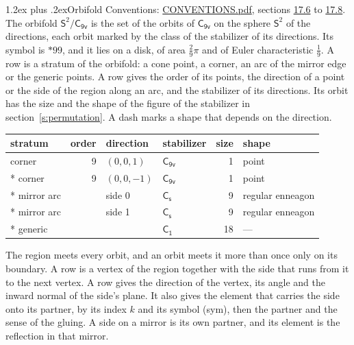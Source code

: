 \documentclass[10pt,a4paper]{article}
\makeatletter
\renewcommand\section{\@startsection{section}{1}{\z@}{-3ex plus -1ex minus -.2ex}%
  {1.2ex plus .2ex}{\normalfont\large\sffamily\bfseries\color{parttitle}}}
\numberwithin{equation}{section}
\newcommand{\grp}[1]{\mathsf{#1}}
\newcommand{\orbname}[1]{#1}
\newcommand{\dirvec}[3]{(#1, #2, #3)}
\newcommand{\twosphere}{\mathsf{S}^{2}}
\makeatother
\begin{document}
\section{Orbifold}\label{s:orbifold}
Conventions: \href{../../CONVENTIONS.pdf}{CONVENTIONS.pdf}, sections \href{../../CONVENTIONS.pdf\#conv.17.6}{17.6} to \href{../../CONVENTIONS.pdf\#conv.17.8}{17.8}.
The orbifold $\twosphere/\grp{C_{9v}}$ is the set of the orbits of $\grp{C_{9v}}$ on the sphere $\twosphere$ of the directions, each orbit marked by the class of the stabilizer of its directions. Its symbol is $\orbname{{\ast}99}$, and it lies on a disk, of area $\tfrac{2}{9}\pi$ and of Euler characteristic $\tfrac{1}{9}$.
\leavevmode\label{n:head.stratum}\label{n:head.order.point}\label{n:head.direction}\label{n:head.stabilizer}\label{n:head.size.orbit}\label{n:head.shape}A row is a stratum of the orbifold: a cone point, a corner, an arc of the mirror edge or the generic points. A row gives the order of its points, the direction of a point or the side of the region along an arc, and the stabilizer of its directions. Its orbit has the size and the shape of the figure of the stabilizer in section~\ref{s:permutation}. A dash marks a shape that depends on the direction.
{\small\setlength{\tabcolsep}{4pt}\begin{longtable}{@{}lrllrl@{}}\toprule
stratum & order & direction & stabilizer & size & shape\\\midrule\endhead
\bottomrule\endfoot\endlastfoot
corner & 9 & $\dirvec{0}{0}{1}$ & \href{C9v.pdf}{$\grp{C_{9v}}$} & 1 & point\\*
corner & 9 & $\dirvec{0}{0}{-1}$ & \href{C9v.pdf}{$\grp{C_{9v}}$} & 1 & point\\*
mirror arc &  & side 0 & \href{C1v.pdf}{$\grp{C_{s}}$} & 9 & regular enneagon\\*
mirror arc &  & side 1 & \href{C1v.pdf}{$\grp{C_{s}}$} & 9 & regular enneagon\\*
generic &  &  & \href{C1.pdf}{$\grp{C_{1}}$} & 18 & ---\\
\bottomrule\end{longtable}}
\leavevmode\label{n:head.vertex.region}\label{n:head.angle}\label{n:head.normal.side}\label{n:head.partner}\label{n:head.sense}The region meets every orbit, and an orbit meets it more than once only on its boundary. A row is a vertex of the region together with the side that runs from it to the next vertex. A row gives the direction of the vertex, its angle and the inward normal of the side's plane. It also gives the element that carries the side onto its partner, by its index $k$ and its symbol (sym), then the partner and the sense of the gluing. A side on a mirror is its own partner, and its element is the reflection in that mirror.
\end{document}
